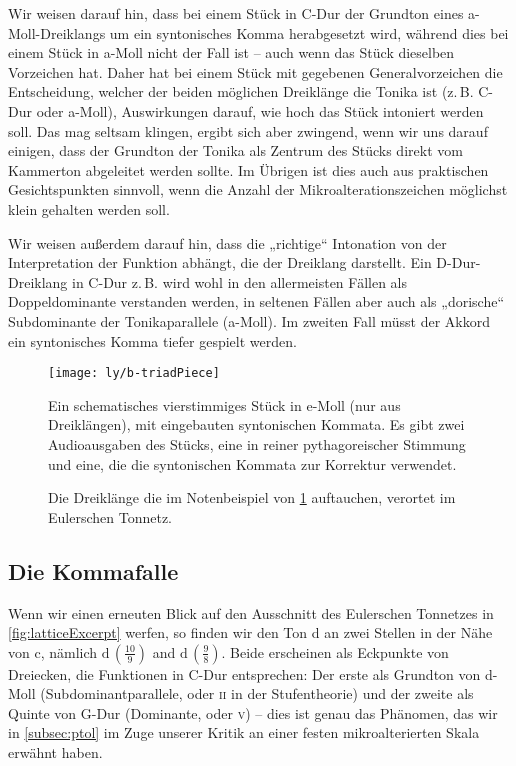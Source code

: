 Wir weisen darauf hin, dass bei einem Stück in C-Dur der Grundton eines
a-Moll-Dreiklangs um ein syntonisches Komma herabgesetzt wird, während dies bei
einem Stück in a-Moll nicht der Fall ist – auch wenn das Stück dieselben
Vorzeichen hat. Daher hat bei einem Stück mit gegebenen Generalvorzeichen die
Entscheidung, welcher der beiden möglichen Dreiklänge die Tonika ist
(z.\,B. C-Dur oder a-Moll), Auswirkungen darauf, wie hoch das Stück intoniert
werden soll. Das mag seltsam klingen, ergibt sich aber zwingend, wenn wir uns
darauf einigen, dass der Grundton der Tonika als Zentrum des Stücks direkt vom
Kammerton abgeleitet werden sollte. Im Übrigen ist dies auch aus praktischen
Gesichtspunkten sinnvoll, wenn die Anzahl der Mikroalterationszeichen möglichst
klein gehalten werden soll.

Wir weisen außerdem darauf hin, dass die „richtige“ Intonation von der
Interpretation der Funktion abhängt, die der Dreiklang darstellt. Ein
D-Dur-Dreiklang in C-Dur z.\,B.  wird wohl in den allermeisten Fällen als
Doppeldominante verstanden werden, in seltenen Fällen aber auch als „dorische“
Subdominante der Tonikaparallele (a-Moll). Im zweiten Fall müsst der Akkord ein
syntonisches Komma tiefer gespielt werden.

\begin{figure}
  \centering
  \texttt{[image: ly/b-triadPiece]}
  \caption{Ein schematisches vierstimmiges Stück in e-Moll (nur aus
  	Dreiklängen), mit eingebauten syntonischen Kommata. Es gibt zwei
  	Audioausgaben des Stücks, eine in reiner pythagoreischer Stimmung und eine,
  	die die syntonischen Kommata zur Korrektur
  	verwendet.}\label{fig:triadPiece}
\end{figure}

\begin{figure}
  
  \caption{Die Dreiklänge die im Notenbeispiel von \cref{fig:triadPiece} auftauchen, verortet im
  	Eulerschen Tonnetz.}\label{fig:chordsLattice}
\end{figure}

\subsection{Die Kommafalle}

Wenn wir einen erneuten Blick auf den Ausschnitt des Eulerschen Tonnetzes in
\cref{fig:latticeExcerpt} werfen, so finden wir den Ton d an zwei Stellen in der
Nähe von c, nämlich \naturalm $\text{d}\,(\frac{10}9)$ and
$\text{d}\,(\frac98)$. Beide erscheinen als Eckpunkte von Dreiecken, die
Funktionen in C-Dur entsprechen: Der erste als Grundton von d-Moll
(Subdominantparallele, oder \textsc{ii} in der Stufentheorie) und der zweite als Quinte von G-Dur (Dominante, oder \textsc{v}) – 
dies ist genau das Phänomen, das wir in \cref{subsec:ptol} im Zuge unserer
Kritik an einer festen mikroalterierten Skala erwähnt haben.

